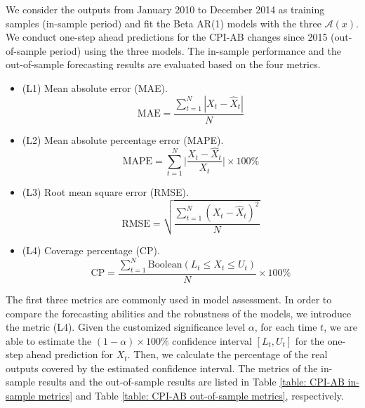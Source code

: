 \documentclass{article}
\theoremstyle{definition}
\begin{document}
We consider the outputs from January 2010 to December 2014 as training samples (in-sample period) and fit the Beta AR(1) models with the three $\mathcal{A}(x)$. We conduct one-step ahead predictions for the CPI-AB changes since 2015 (out-of-sample period) using the three models. The in-sample performance and the out-of-sample forecasting results are evaluated based on the four metrics.
\begin{itemize}
    \item (L1) Mean absolute error (MAE).
    \begin{equation*}
        \text{MAE} = \frac{\sum_{t=1}^N |X_t-\hat{X}_t|}{N}
    \end{equation*}
    \item (L2) Mean absolute percentage error (MAPE).
    \begin{equation*}
        \text{MAPE} = \sum_{t=1}^N \Big|\frac{X_t-\hat{X}_t}{X_t}\Big| \times 100\%
    \end{equation*}
    \item (L3) Root mean square error (RMSE).
    \begin{equation*}
        \text{RMSE} = \sqrt{\frac{\sum_{t=1}^N (X_t-\hat{X}_t)^2}{N}}
    \end{equation*}
    \item (L4) Coverage percentage (CP).
    \begin{equation*}
            \text{CP} = \frac{\sum_{t=1}^N \text{Boolean}(L_t \leq X_t \leq U_t)}{N} \times 100\%
    \end{equation*}
\end{itemize}
The first three metrics are commonly used in model assessment. In order to compare the forecasting abilities and the robustness of the models, we introduce the metric (L4). Given the customized significance level $\alpha$, for each time $t$, we are able to estimate the $(1-\alpha) \times 100\%$ confidence interval $[L_t, U_t]$ for the one-step ahead prediction for $X_t$. Then, we calculate the percentage of the real outputs covered by the estimated confidence interval. The metrics of the in-sample results and the out-of-sample results are listed in Table \ref{table: CPI-AB in-sample metrics} and Table \ref{table: CPI-AB out-of-sample metrics}, respectively.
\end{document}

